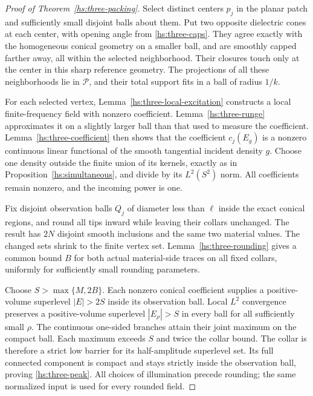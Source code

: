 \begin{proof}[Proof of Theorem~\ref{hs:three-packing}]
Select distinct centers $p_j$ in the planar patch and sufficiently
small disjoint balls about them.  Put two opposite dielectric cones
at each center, with opening angle from \eqref{hs:three-caps}.
They agree exactly with the homogeneous conical geometry on a
smaller ball, and are smoothly capped farther away, all within
the selected neighborhood.  Their closures touch only at the
center in this sharp reference geometry.  The projections of all
these neighborhoods lie in $\mathcal P$, and their total support
fits in a ball of radius $1/k$.

For each selected vertex, Lemma~\ref{hs:three-local-excitation}
constructs a local finite-frequency field with nonzero coefficient.
Lemma~\ref{hs:three-runge} approximates it on a slightly larger
ball than that used to measure the coefficient.
Lemma~\ref{hs:three-coefficient} then shows that the coefficient
$c_j(E_g)$ is a nonzero continuous linear functional of the smooth
tangential incident density $g$.  Choose one density outside the
finite union of its kernels, exactly as in
Proposition~\ref{hs:simultaneous}, and divide by its $L^2(S^2)$ norm.
All coefficients remain nonzero, and the incoming power is one.

Fix disjoint observation balls $Q_j$ of diameter less than $\ell$
inside the exact conical regions, and round all tips inward while
leaving their collars unchanged.  The result has $2N$ disjoint smooth
inclusions and the same two material values.  The changed sets shrink
to the finite vertex set.  Lemma~\ref{hs:three-rounding} gives a common
bound $B$ for both actual material-side traces on all fixed collars,
uniformly for sufficiently small rounding parameters.

Choose $S>\max\{M,2B\}$.  Each nonzero conical coefficient supplies
a positive-volume superlevel $|E|>2S$ inside its observation ball.
Local $L^2$ convergence preserves a positive-volume superlevel
$|E_\rho|>S$ in every ball for all sufficiently small $\rho$.
The continuous one-sided branches attain their joint maximum on the
compact ball.  Each maximum exceeds $S$ and twice the collar bound.
The collar is therefore a strict low barrier for its half-amplitude
superlevel set.  Its full connected component is compact and stays
strictly inside the observation ball, proving \eqref{hs:three-peak}.
All choices of illumination precede rounding; the same normalized
input is used for every rounded field.
\end{proof}

